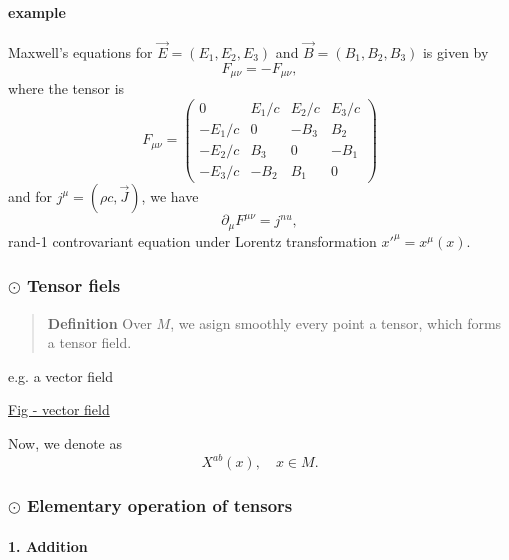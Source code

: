 \paragraph{example} %

Maxwell's equations for $\vec{E} = (E_1,E_2,E_3)$ and $\vec{B} = (B_1,B_2,B_3)$ is given by
\begin{equation}
F_{\mu\nu} = - F_{\mu\nu},
\end{equation}
where the tensor is
\begin{equation}
F_{\mu\nu}=
\begin{pmatrix}
0			&E_{1}/c	&E_{2}/c	&E_{3}/c\\
-E_{1}/c	&0			&-B_{3}		&B_{2}\\
-E_{2}/c	&B_{3}		&0			&-B_{1}\\
-E_{3}/c	&-B_{2}		&B_{1}		&0
\end{pmatrix}
\end{equation}
and for $j^{\mu} = \left(\rho c,\vec{J}\right)$, we have
\begin{equation}
\partial_{\mu}F^{\mu\nu} = j^{nu},
\end{equation}
rand-1 controvariant equation under Lorentz transformation $x'^{\mu} = x^{\mu}(x)$​ .

\subsubsection{$\odot$ Tensor fiels} %

\begin{quote}
	\textbf{Definition}
Over $M$, we asign smoothly every point a tensor, which forms a tensor field.
\end{quote}

e.g. a vector field

\underline{Fig - vector field}

Now, we denote as 
\begin{equation}
X^{ab}(x),\quad x\in M.
\end{equation}


\subsubsection{$\odot$ Elementary operation of tensors} %

\paragraph{1. Addition} %


